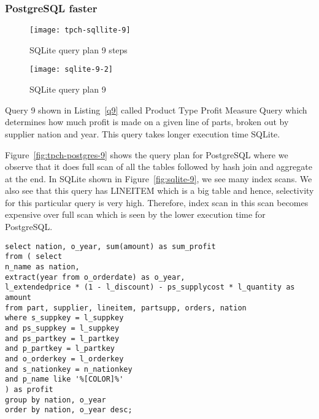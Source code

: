 


\subsubsection{PostgreSQL faster}

\begin{figure*}[ht]
\centering
     \begin{subfigure}[b]{0.4\textwidth}
         \centering
         \texttt{[image: tpch-sqllite-9]}
         \caption{SQLite query plan 9 steps}
         \label{fig:tpch-sqllite-9}
     \end{subfigure}
     \hfill
     \begin{subfigure}[b]{0.4\textwidth}
         \centering
         \texttt{[image: sqlite-9-2]}
         \caption{SQLite query plan 9}
         \label{fig:sqlite-9-2}
     \end{subfigure}

        \caption{SQLite plan for query 9}
        \label{fig:sqlite-9}
\end{figure*}
Query 9 shown in Listing~\ref{q9} called Product Type Profit Measure Query which determines how much profit is made on a given line of parts, broken out by supplier nation and year. This query takes longer execution time SQLite.

Figure~\ref{fig:tpch-postgres-9} shows the query plan for PostgreSQL where we observe that it does full scan of all the tables followed by hash join and aggregate at the end. In SQLite shown in Figure~\ref{fig:sqlite-9}, we see many index scans. We also see that this query has LINEITEM which is a big table and hence, selectivity for this particular query is very high. Therefore, index scan in this scan becomes expensive over full scan which is seen by the lower execution time for PostgreSQL.

\begin{minipage}{\linewidth}
\begin{lstlisting}[breaklines=true, numbers=none, label=q9, caption=Query 9]
select nation, o_year, sum(amount) as sum_profit
from ( select
n_name as nation,
extract(year from o_orderdate) as o_year,
l_extendedprice * (1 - l_discount) - ps_supplycost * l_quantity as amount
from part, supplier, lineitem, partsupp, orders, nation
where s_suppkey = l_suppkey
and ps_suppkey = l_suppkey
and ps_partkey = l_partkey
and p_partkey = l_partkey
and o_orderkey = l_orderkey
and s_nationkey = n_nationkey
and p_name like '%[COLOR]%'
) as profit
group by nation, o_year
order by nation, o_year desc;
\end{lstlisting}
\end{minipage}

